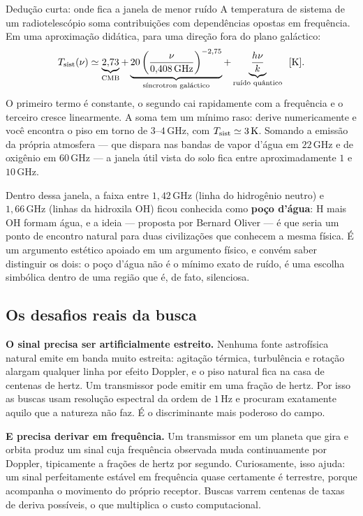 \documentclass[11pt,a4paper]{article}
\begin{document}
\begin{lessonblock}[borderline west={2pt}{0pt}{astroGold}]{Dedução curta: onde fica a janela de menor ruído}
A temperatura de sistema de um radiotelescópio soma contribuições com dependências opostas em frequência. Em uma aproximação didática, para uma direção fora do plano galáctico:
\[
T_{\rm sist}(\nu)\simeq\underbrace{2{,}73}_{\text{CMB}}
+\underbrace{20\left(\frac{\nu}{0{,}408\,\mathrm{GHz}}\right)^{-2{,}75}}_{\text{síncrotron galáctico}}
+\underbrace{\frac{h\nu}{k}}_{\text{ruído quântico}}\ \ [\mathrm{K}].
\]
O primeiro termo é constante, o segundo cai rapidamente com a frequência e o terceiro cresce linearmente. A soma tem um mínimo raso: derive numericamente e você encontra o piso em torno de $3$--$4\,\mathrm{GHz}$, com $T_{\rm sist}\simeq3\,\mathrm{K}$. Somando a emissão da própria atmosfera --- que dispara nas bandas de vapor d'água em $22\,\mathrm{GHz}$ e de oxigênio em $60\,\mathrm{GHz}$ --- a janela útil vista do solo fica entre aproximadamente $1$ e $10\,\mathrm{GHz}$.

Dentro dessa janela, a faixa entre $1{,}42\,\mathrm{GHz}$ (linha do hidrogênio neutro) e $1{,}66\,\mathrm{GHz}$ (linhas da hidroxila OH) ficou conhecida como \textbf{poço d'água}: H mais OH formam água, e a ideia --- proposta por Bernard Oliver --- é que seria um ponto de encontro natural para duas civilizações que conhecem a mesma física. É um argumento estético apoiado em um argumento físico, e convém saber distinguir os dois: o poço d'água não é o mínimo exato de ruído, é uma escolha simbólica dentro de uma região que é, de fato, silenciosa.
\end{lessonblock}

\subsection*{Os desafios reais da busca}

\textbf{O sinal precisa ser artificialmente estreito.} Nenhuma fonte astrofísica natural emite em banda muito estreita: agitação térmica, turbulência e rotação alargam qualquer linha por efeito Doppler, e o piso natural fica na casa de centenas de hertz. Um transmissor pode emitir em uma fração de hertz. Por isso as buscas usam resolução espectral da ordem de $1\,\mathrm{Hz}$ e procuram exatamente aquilo que a natureza não faz. É o discriminante mais poderoso do campo.

\textbf{E precisa derivar em frequência.} Um transmissor em um planeta que gira e orbita produz um sinal cuja frequência observada muda continuamente por Doppler, tipicamente a frações de hertz por segundo. Curiosamente, isso ajuda: um sinal perfeitamente estável em frequência quase certamente é terrestre, porque acompanha o movimento do próprio receptor. Buscas varrem centenas de taxas de deriva possíveis, o que multiplica o custo computacional.
\end{document}
